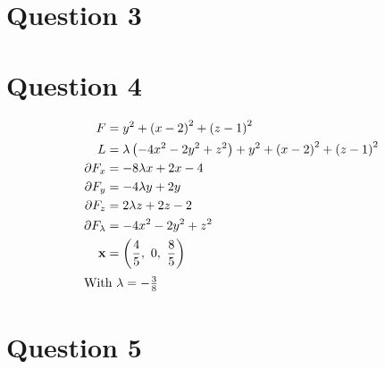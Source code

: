 \documentclass[a4paper,12pt]{article} %
\begin{document}
\section*{\textbf{Question 3}}

\newpage
\section*{\textbf{Question 4}}
\begin{align*}
    F &= y^{2} + \left(x - 2\right)^{2} + \left(z - 1\right)^{2} \\
    L &= \lambda \left(- 4 x^{2} - 2 y^{2} + z^{2}\right) + y^{2} + \left(x - 2\right)^{2} + \left(z - 1\right)^{2} \\
    \partial F_{x} &= - 8 \lambda x + 2 x - 4 \\
    \partial F_{y} &= - 4 \lambda y + 2 y \\
    \partial F_{z} &= 2 \lambda z + 2 z - 2 \\
    \partial F_{\lambda} &= - 4 x^{2} - 2 y^{2} + z^{2} \\
    \mathbf{x} &=   \left( \frac{4}{5}, \  0, \  \frac{8}{5}\right) \\
    \intertext{With $\lambda = - \frac{3}{8}$}
\end{align*}
\newpage
\section*{\textbf{Question 5}}
\end{document}
